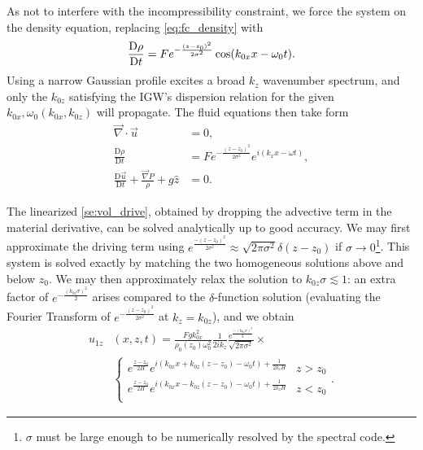 \documentclass[twocolumn,
        nofootinbib,
        usenames, %
        dvipsnames %
    ]{revtex4-1}%
\newcommand*{\md}[2]{\frac{\mathrm{D}#1}{\mathrm{D}#2}}
\DeclarePairedDelimiter\p{\lparen}{\rparen}
\begin{document}
As not to interfere with the incompressibility constraint, we force the system
on the density equation, replacing \autoref{eq:fc_density} with
\begin{equation}
    \md{\rho}{t} = Fe^{-\frac{(z - z_0)^2}{2\sigma^2}}
            \cos \p*{k_{0x}x - \omega_0 t}.
\end{equation}
Using a narrow Gaussian profile excites a broad $k_z$ wavenumber spectrum, and
only the $k_{0z}$ satisfying the IGW's dispersion relation for the given
$k_{0x}, \omega_0(k_{0x}, k_{0z})$ will propagate. The fluid equations then take
form
\begin{subequations}\label{se:vol_drive}
    \begin{align}
        \vec{\nabla} \cdot \vec{u} &= 0,\\
        \md{\rho}{t} &= Fe^{-\frac{(z - z_0)^2}{2\sigma^2}}
                e^{i(k_xx - \omega t)},\\
        \md{\vec{u}}{t} + \frac{\vec{\nabla}P}{\rho}
            + g\hat{z} &= 0.
    \end{align}
\end{subequations}

The linearized \autoref{se:vol_drive}, obtained by dropping the advective term
in the material derivative, can be solved analytically up to good accuracy. We
may first approximate the driving term using $e^{\frac{-(z - z_0)^2}{2\sigma^2}}
\approx \sqrt{2\pi \sigma^2}\delta(z - z_0)$ if $\sigma \to 0$\footnote{$\sigma$
must be large enough to be numerically resolved by the spectral code.}. This
system is solved exactly by matching the two homogeneous solutions above and
below $z_0$. We may then approximately relax the solution to $k_{0z}\sigma
\lesssim 1$: an extra factor of $e^{-\frac{(k_{0z}\sigma)^2}{2}}$ arises
compared to the $\delta$-function solution (evaluating the Fourier Transform
of $e^{-\frac{(z - z_0)^2}{2\sigma^2}}$ at $k_z = k_{0z}$), and we obtain
\begin{align}
    u_{1z}&(x, z, t) ={} \frac{Fgk_{0x}^2}{\rho_0(z_0)\omega_0^2}
        \frac{1}{2ik_z}\frac{e^{\frac{-(k_{0z}\sigma)^2}{2}}}
        {\sqrt{2\pi\sigma^2}} \times\nonumber\\
        &{}\begin{cases}
        e^{\frac{z - z_0}{2H}}e^{i(k_{0x}x + k_{0z}(z - z_0) - \omega_0 t)
            + \frac{1}{2k_zH}}
            & z > z_0\\
        e^{\frac{z - z_0}{2H}}e^{i(k_{0x}x - k_{0z}(z - z_0) - \omega_0 t)
            + \frac{1}{2k_zH}}
            & z < z_0\\
    \end{cases}.\label{eq:uz_lin}
\end{align}
\end{document}
